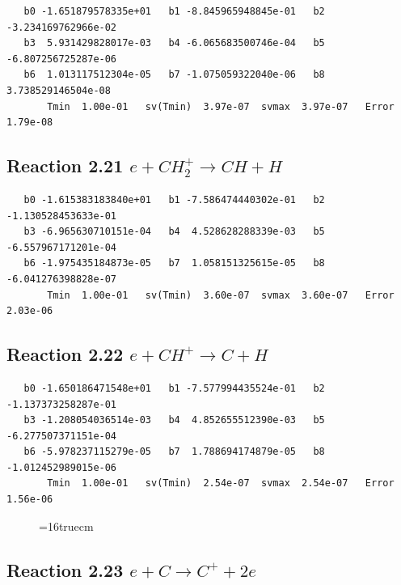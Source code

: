 \documentclass[12pt,dvipdfmx]{article}
\begin{document}
\begin{small}\begin{verbatim}
   b0 -1.651879578335e+01   b1 -8.845965948845e-01   b2 -3.234169762966e-02
   b3  5.931429828017e-03   b4 -6.065683500746e-04   b5 -6.807256725287e-06
   b6  1.013117512304e-05   b7 -1.075059322040e-06   b8  3.738529146504e-08
       Tmin  1.00e-01   sv(Tmin)  3.97e-07  svmax  3.97e-07   Error  1.79e-08
\end{verbatim}\end{small}

\subsection{
Reaction 2.21     $e + CH_2^+ \rightarrow CH + H $
}

\begin{small}\begin{verbatim}
   b0 -1.615383183840e+01   b1 -7.586474440302e-01   b2 -1.130528453633e-01
   b3 -6.965630710151e-04   b4  4.528628288339e-03   b5 -6.557967171201e-04
   b6 -1.975435184873e-05   b7  1.058151325615e-05   b8 -6.041276398828e-07
       Tmin  1.00e-01   sv(Tmin)  3.60e-07  svmax  3.60e-07   Error  2.03e-06
\end{verbatim}\end{small}


\subsection{
Reaction 2.22     $e + CH^+ \rightarrow C + H $
}

\begin{small}\begin{verbatim}
   b0 -1.650186471548e+01   b1 -7.577994435524e-01   b2 -1.137373258287e-01
   b3 -1.208054036514e-03   b4  4.852655512390e-03   b5 -6.277507371151e-04
   b6 -5.978237115279e-05   b7  1.788694174879e-05   b8 -1.012452989015e-06
       Tmin  1.00e-01   sv(Tmin)  2.54e-07  svmax  2.54e-07   Error  1.56e-06
\end{verbatim}\end{small}

\begin{figure} \label{met.2_2.20.2}
\epsfxsize=16truecm
\end{figure}
\newpage

\subsection{
Reaction 2.23     $e + C \rightarrow C^+ + 2e $
}
\end{document}
